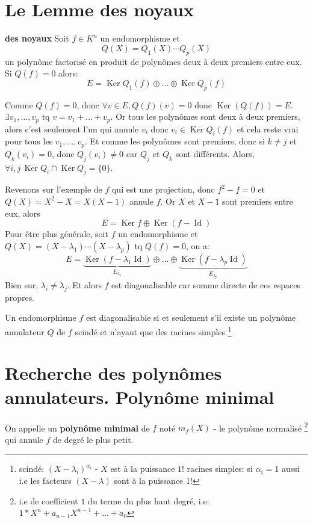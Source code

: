 \section{Le Lemme des noyaux}
\begin{lemma}\label{lemma:lemme-des-noyaux} \textbf{des noyaux}
   Soit $f \in K^n$ un endomorphisme et 
   \[
   Q(X) = Q_1(X) \cdots Q_p(X)
   \] 
   un polynôme factorisé en produit de polynômes deux à deux premiers entre eux. Si $Q(f) = 0$ alors:
    \[
        E = \operatorname{Ker} Q_1(f) \oplus \ldots \oplus \operatorname{Ker} Q_p(f)
   \] 
\end{lemma}
\begin{intuition}
    Comme $Q(f) = 0$, donc  $\forall v \in E, Q(f)(v) = 0$ donc
    $\operatorname{Ker}(Q(f)) = E$. $\exists v_1, \ldots, v_p$ tq $v = v_1 +
    \ldots + v_p$. Or tous les polynômes sont deux à deux premiers, alors c'est
    seulement l'un qui annule $v_i$ donc  $v_i \in \operatorname{Ker}Q_i(f)$ et
    cela reste vrai pour tous les $v_1, \ldots, v_p$. Et comme les polynômes
    sont premiers, donc si $k \neq j$ et $Q_k(v_i) = 0$, donc  $Q_j(v_i) \neq
    0$ car $Q_j$ et  $Q_k$ sont différents. Alors,  $\forall i, j \,
    \operatorname{Ker}Q_i \cap \operatorname{Ker}Q_j = \{0\}$.
\end{intuition}
\begin{remark}
   Revenons sur l'exemple de $f$ qui est une projection, donc  $f^2 - f = 0$ et  $Q(X) = X^2 - X = X(X-1)$ annule $f$. Or  $X$ et  $X-1$ sont premiers entre eux, alors 
    \[
        E = \operatorname{Ker}f \oplus \operatorname{Ker}(f - \operatorname{Id})
   \] 
    Pour être plus générale, soit $f$ un endomorphisme et $Q(X) = (X - \lambda_1) \cdots (X - \lambda_p)$ tq $Q(f) = 0$, on a:
     \[
         E = \underbrace{\operatorname{Ker}(f - \lambda_1 \operatorname{Id})}_{E_{\lambda_1}} \oplus \ldots \oplus \underbrace{\operatorname{Ker}(f - \lambda_p \operatorname{Id})}_{E_{\lambda_p}}
    \] 
    Bien sur, $\lambda_i \neq \lambda_j$. Et alors $f$ est diagonalisable car somme directe de ces espaces propres.
\end{remark}
\begin{corollary}
    Un endomorphisme $f$ est diagonalisable si et seulement s'il existe un polynôme annulateur  $Q$ de  $f$ scindé et n'ayant que des racines simples \footnote{scindé: $(X - \lambda_i)^{\alpha_i}$ - $X$ est à la puissance  $1$! racines simples: si  $\alpha_i = 1$ aussi i.e les facteurs  $(X - \lambda)$ sont à la puissance 1!} 
\end{corollary}

\section{Recherche des polynômes annulateurs. Polynôme minimal}
\begin{definition}
    On appelle un  \textbf{polynôme minimal} de $f$ noté  $m_f(X)$ - le polynôme normalisé \footnote{i.e de coefficient $1$ du terme du plus haut degré, i.e:  $1*X^n + a_{n-1}X^{n-1} + \ldots + a_0$} qui annule $f$ de degré le plus petit.
\end{definition}
